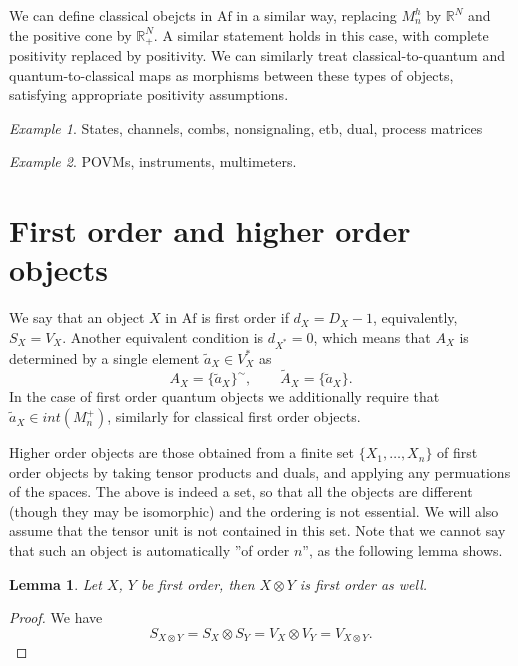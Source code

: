 \documentclass[12pt]{article}
\newtheorem{lemma}{Lemma}
\theoremstyle{definition}
\theoremstyle{remark}
\newtheorem{exm}{Example}
\def \Af{\mathrm{Af}}
\begin{document}
We can define classical obejcts in $\Af$ in a similar way, replacing $M_n^h$ by $\mathbb
R^N$ and the positive cone by $\mathbb R_+^N$. A similar statement holds in this case,
with complete positivity replaced by positivity. We can similarly treat
classical-to-quantum and quantum-to-classical maps as morphisms between these types of
objects, satisfying appropriate positivity assumptions.

\begin{exm}\label{exm:quantum_maps} States, channels, combs, nonsignaling, etb, dual, process
matrices

\end{exm}

\begin{exm}\label{exm:qccq} POVMs, instruments, multimeters.


\end{exm}


\section{First order and higher order objects}


We say that an object $X$ in $\Af$ is first order if $d_X=D_X-1$, equivalently, $S_X=V_X$.
Another equivalent condition is $d_{X^*}=0$, which means that $A_X$ is determined by a
single element $\tilde a_X\in V_X^*$ as 
\[
A_X=\{\tilde a_X\}^\sim,\qquad \tilde A_X=\{\tilde a_X\}.
\]
In the case of first order quantum objects we additionally require that $\tilde a_X\in
int(M_n^+)$, similarly for classical first order objects.

Higher order objects are those obtained from a finite set $\{X_1,\dots,X_n\}$ of first order objects by
taking tensor products and duals, and applying any permuations of the spaces. The above is indeed a set, so that all the objects are
different (though they may be isomorphic) and the ordering is not essential. We will also
assume that the tensor unit is not contained in this set. Note that we cannot say that
such an object is automatically ''of order $n$'', as the following lemma shows. 

\begin{lemma}\label{lemma:1ordertensor} Let $X$, $Y$ be first order, then $X\otimes Y$ is
first order as well.

\end{lemma}

\begin{proof} We have
\[
S_{X\otimes Y}=S_X\otimes S_Y=V_X\otimes V_Y=V_{X\otimes Y}.
\]

\end{proof}
\end{document}
